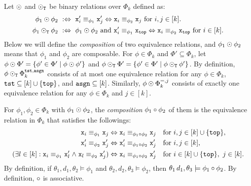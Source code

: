 Let $\odot$ and $\odot_{\mathtt{T}}$ be binary relations over $\Phi_k$ defined as:
\begin{align*}
  \phi_1\COMPBL\phi_2 \ &:\Leftrightarrow \
      \R_i \equiv_{\phi_1} \R_j \Leftrightarrow \L_i \equiv_{\phi_2} \L_j
      \ \text{for } i,j\in[k].
  \\
%
  \phi_1\COMPBLT\phi_2 \ &:\Leftrightarrow \
      \phi_1\COMPBL\phi_2 \ \text{and} \
      \R_i \equiv_{\phi_1} \Ltop \Leftrightarrow \L_i \equiv_{\phi_2} \Ltop
      \ \text{for } i\in[k].
\end{align*}
Below we will define the \emph{composition} of two equivalence relations,
and $\phi_1\odot\phi_2$ means that
$\phi_1$ and $\phi_2$ are composable.
%
For $\phi\in\Phi_k$ and $\Phi'\subseteq\Phi_k$,
let $\phi\odot\Phi' = \{\phi'\in\Phi' \mid \phi\odot\phi'\}$
and $\phi\odot_{\mathtt{T}}\Phi' = \{\phi'\in\Phi' \mid \phi\odot_{\mathtt{T}}\phi'\}$.
By definition,
$\phi\odot_{\mathtt{T}}\Phi_k^{\mathtt{tst},\mathtt{asgn}}$ consists of at most one equivalence relation
for any $\phi\in\Phi_k$, $\mathtt{tst}\subseteq [k]\cup\{\mathtt{top}\}$,
and $\mathtt{asgn}\subseteq[k]$.
Similarly,
$\phi\odot\Phi_k^{=,j}$ consists of exactly one equivalence relation
for any $\phi\in\Phi_k$ and $j\in [k]$.


For $\phi_1,\phi_2\in\Phi_k$ with $\phi_1\odot\phi_2$,
the \emph{composition} $\phi_1\circ\phi_2$ of them
is the equivalence relation in $\Phi_k$ that satisfies the followings:
\begin{align*}
  {\tt x}_i \equiv_{\phi_1} {\tt x}_j &\Leftrightarrow
  {\tt x}_i \equiv_{\phi_1\circ\phi_2} {\tt x}_j &&\text{for } i,j\in [k]\cup\{\mathtt{top}\},\\
  {\tt x}'_i \equiv_{\phi_2} {\tt x}'_j &\Leftrightarrow
  {\tt x}'_i \equiv_{\phi_1\circ\phi_2} {\tt x}'_j &&\text{for } i,j\in [k],\\
  (\exists l\in [k] : {\tt x}_i \equiv_{\phi_1} {\tt x}'_l \mathrel{\land}
  {\tt x}_l \equiv_{\phi_2} {\tt x}'_j) &\Leftrightarrow
  {\tt x}_i \equiv_{\phi_1\circ\phi_2} {\tt x}'_j
  &&\text{for } i\in[k]\cup\{\mathtt{top}\},\ j\in [k].
\end{align*}
%
By definition,
if $\theta_1,d_1,\theta_2\models\phi_1$ and
$\theta_2,d_2,\theta_3\models\phi_2$,
then
$\theta_1\,d_1,\theta_3\models\phi_1\circ\phi_2$.
By definition, $\circ$ is associative.

\smallskip

